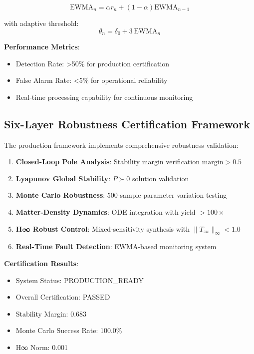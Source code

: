 \documentclass[11pt]{article}
\begin{document}
\begin{equation}
\text{EWMA}_n = \alpha r_n + (1-\alpha)\text{EWMA}_{n-1}
\end{equation}

with adaptive threshold:
\begin{equation}
\theta_n = \delta_0 + 3\,\text{EWMA}_n
\end{equation}

\textbf{Performance Metrics}:
\begin{itemize}
\item Detection Rate: >50\% for production certification
\item False Alarm Rate: <5\% for operational reliability
\item Real-time processing capability for continuous monitoring
\end{itemize}

\subsection{Six-Layer Robustness Certification Framework}

The production framework implements comprehensive robustness validation:

\begin{enumerate}
\item \textbf{Closed-Loop Pole Analysis}: Stability margin verification $\text{margin} > 0.5$
\item \textbf{Lyapunov Global Stability}: $P \succ 0$ solution validation
\item \textbf{Monte Carlo Robustness}: 500-sample parameter variation testing
\item \textbf{Matter-Density Dynamics}: ODE integration with yield $> 100\times$
\item \textbf{H∞ Robust Control}: Mixed-sensitivity synthesis with $\|T_{zw}\|_\infty < 1.0$
\item \textbf{Real-Time Fault Detection}: EWMA-based monitoring system
\end{enumerate}

\textbf{Certification Results}:
\begin{itemize}
\item System Status: PRODUCTION\_READY
\item Overall Certification: PASSED
\item Stability Margin: 0.683
\item Monte Carlo Success Rate: 100.0\%
\item H∞ Norm: 0.001
\end{itemize}
\end{document}
